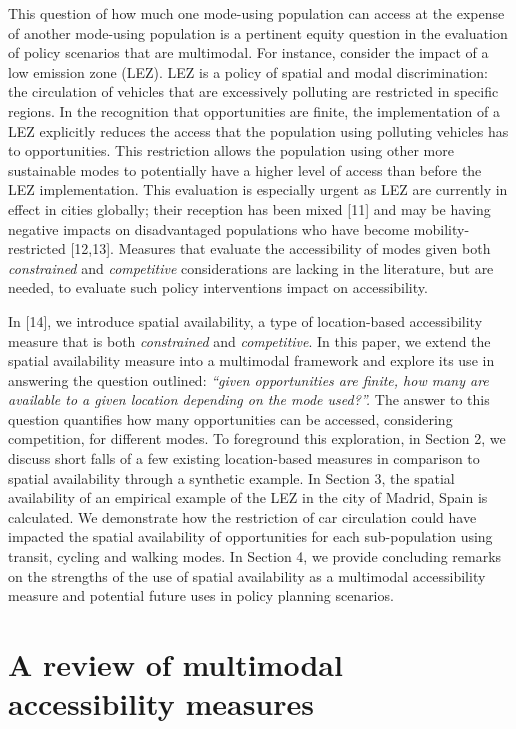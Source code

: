 \documentclass[10pt,letterpaper]{article}
\begin{document}
This question of how much one mode-using population can access at the
expense of another mode-using population is a pertinent equity question
in the evaluation of policy scenarios that are multimodal. For instance,
consider the impact of a low emission zone (LEZ). LEZ is a policy of
spatial and modal discrimination: the circulation of vehicles that are
excessively polluting are restricted in specific regions. In the
recognition that opportunities are finite, the implementation of a LEZ
explicitly reduces the access that the population using polluting
vehicles has to opportunities. This restriction allows the population
using other more sustainable modes to potentially have a higher level of
access than before the LEZ implementation. This evaluation is especially
urgent as LEZ are currently in effect in cities globally; their
reception has been mixed {[}11{]} and may be having negative impacts on
disadvantaged populations who have become mobility-restricted
{[}12,13{]}. Measures that evaluate the accessibility of modes given
both \emph{constrained} and \emph{competitive} considerations are
lacking in the literature, but are needed, to evaluate such policy
interventions impact on accessibility.

In {[}14{]}, we introduce spatial availability, a type of location-based
accessibility measure that is both \emph{constrained} and
\emph{competitive}. In this paper, we extend the spatial availability
measure into a multimodal framework and explore its use in answering the
question outlined: \emph{``given opportunities are finite, how many are
available to a given location depending on the mode used?''.} The answer
to this question quantifies how many opportunities can be accessed,
considering competition, for different modes. To foreground this
exploration, in Section 2, we discuss short falls of a few existing
location-based measures in comparison to spatial availability through a
synthetic example. In Section 3, the spatial availability of an
empirical example of the LEZ in the city of Madrid, Spain is calculated.
We demonstrate how the restriction of car circulation could have
impacted the spatial availability of opportunities for each
sub-population using transit, cycling and walking modes. In Section 4,
we provide concluding remarks on the strengths of the use of spatial
availability as a multimodal accessibility measure and potential future
uses in policy planning scenarios.

\hypertarget{a-review-of-multimodal-accessibility-measures}{%
\section{A review of multimodal accessibility
measures}\label{a-review-of-multimodal-accessibility-measures}}
\end{document}
